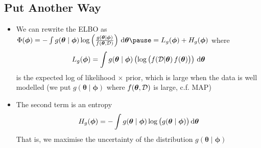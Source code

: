 \begin{slide}
\section[-2]{Put Another Way}

\begin{PauseHighLight}
  \begin{itemize}
  \item We can rewrite the ELBO as $\Phi(\bm{\phi})
    =-\int g(\bm{\theta}\mid\bm{\phi})
      \logg{\frac{g(\bm{\theta}\mid\bm{\phi})}{f(\bm{\theta}, \data)}} \,
      \dd \bm{\theta}\pause =  L_g(\bm{\phi}) + H_g(\bm{\phi})$\pause{} where
    \begin{align*}
      L_g(\bm{\phi}) = \int g(\bm{\theta}\mid\bm{\phi}) \left( 
      \log\left( \strut f(\mathcal{D}| \bm{\theta}) \, f(\bm{\theta}) \right)  \right) \, \mathrm{d} \bm{\theta}
    \end{align*}
    is the expected log of likelihood $\times$ prior, which is large when the
    data is well modelled (we put
    $g(\bm{\theta}\mid\bm{\phi})$ where $f(\bm{\theta}, \mathcal{D})$ is
    large, c.f. MAP)\pause
  \item The second term is an entropy
    \begin{align*}
      H_g(\bm{\phi}) = - \int g(\bm{\theta}\mid\bm{\phi})
      \log\left( \strut g(\bm{\theta}\mid\bm{\phi}) \right) \mathrm{d} \bm{\theta}
    \end{align*}
    That is, we maximise the uncertainty of the distribution $g(\bm{\theta}\mid\bm{\phi})$\pause
  \end{itemize}
\end{PauseHighLight}

\end{slide}



